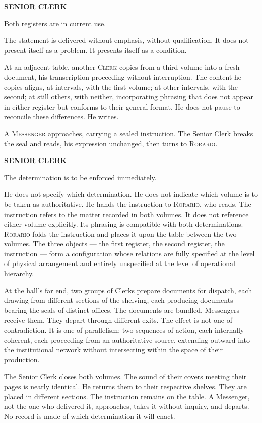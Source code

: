 \documentclass[12pt, oneside]{article}
\newenvironment{action}{%
  \vspace{0.6em}%
  \noindent\ignorespaces%
}{%
  \par\vspace{0.6em}%
}
\newcommand{\character}[1]{%
  \vspace{0.8em}%
  \begin{center}%
    \bfseries\MakeUppercase{#1}%
  \end{center}%
  \vspace{-0.3em}%
}
\newenvironment{dialogue}{%
  \vspace{0.2em}%
  \begin{list}{}{%
    \setlength{\leftmargin}{1.2in}%
    \setlength{\rightmargin}{0.8in}%
    \setlength{\itemsep}{0.6em}%
    \setlength{\parsep}{0pt}%
  }%
}{%
  \end{list}%
  \vspace{0.4em}%
}
\newcommand{\says}[2]{%
  \character{#1}%
  \begin{dialogue}\item #2\end{dialogue}%
}
\begin{document}
\says{Senior Clerk}{Both registers are in current use.}

\begin{action}
The statement is delivered without emphasis, without qualification. It does not present itself as a problem. It presents itself as a condition.

At an adjacent table, another \textsc{Clerk} copies from a third volume into a fresh document, his transcription proceeding without interruption. The content he copies aligns, at intervals, with the first volume; at other intervals, with the second; at still others, with neither, incorporating phrasing that does not appear in either register but conforms to their general format. He does not pause to reconcile these differences. He writes.

A \textsc{Messenger} approaches, carrying a sealed instruction. The Senior Clerk breaks the seal and reads, his expression unchanged, then turns to \textsc{Rorario}.
\end{action}

\says{Senior Clerk}{The determination is to be enforced immediately.}

\begin{action}
He does not specify which determination. He does not indicate which volume is to be taken as authoritative. He hands the instruction to \textsc{Rorario}, who reads. The instruction refers to the matter recorded in both volumes. It does not reference either volume explicitly. Its phrasing is compatible with both determinations. \textsc{Rorario} folds the instruction and places it upon the table between the two volumes. The three objects --- the first register, the second register, the instruction --- form a configuration whose relations are fully specified at the level of physical arrangement and entirely unspecified at the level of operational hierarchy.

At the hall's far end, two groups of Clerks prepare documents for dispatch, each drawing from different sections of the shelving, each producing documents bearing the seals of distinct offices. The documents are bundled. Messengers receive them. They depart through different exits. The effect is not one of contradiction. It is one of parallelism: two sequences of action, each internally coherent, each proceeding from an authoritative source, extending outward into the institutional network without intersecting within the space of their production.

The Senior Clerk closes both volumes. The sound of their covers meeting their pages is nearly identical. He returns them to their respective shelves. They are placed in different sections. The instruction remains on the table. A Messenger, not the one who delivered it, approaches, takes it without inquiry, and departs. No record is made of which determination it will enact.
\end{action}
\end{document}
